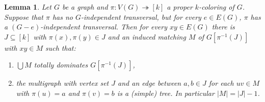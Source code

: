 \documentclass[12pt]{article}
\theoremstyle{plain}
\newtheorem{lem}[thm]{Lemma}
\theoremstyle{definition}
\theoremstyle{remark}
\newcommand{\surj}{\twoheadrightarrow}
\newcommand{\card}[1]{\left|#1\right|}
\newcommand{\funcsurj}[3]{#1\colon #2 \surj #3}
\newcommand{\irange}[1]{\left[#1\right]}
\newcommand{\brackets}[1]{\left[ #1 \right]}
\begin{document}
\begin{lem}\label{BaseTransversalLemma}
Let $G$ be a graph and $\funcsurj{\pi}{V(G)}{\irange{k}}$ a proper $k$-coloring of
$G$.  Suppose that $\pi$ has no $G$-independent transversal, but for every $e
\in E(G)$, $\pi$ has a $(G-e)$-independent transversal. Then for every $xy \in
E(G)$ there is $J \subseteq \irange{k}$ with $\pi(x), \pi(y) \in J$ and an 
induced matching $M$ of $G\brackets{\pi^{-1}(J)}$ with $xy \in M$ such that:
\begin{enumerate}
  \item $\bigcup M$ totally dominates $G\brackets{\pi^{-1}(J)}$,
  \item the multigraph with vertex set $J$ and an edge between $a, b \in J$ for
  each $uv \in M$ with $\pi(u) = a$ and $\pi(v) = b$ is a (simple) tree.  In
  particular $\card{M} = \card{J} - 1$.
\end{enumerate}
\end{lem}
\end{document}
